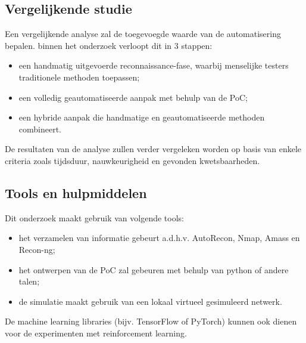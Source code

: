 



\subsection{Vergelijkende studie}

Een vergelijkende analyse zal de toegevoegde waarde van de automatisering bepalen. binnen het onderzoek verloopt dit in 3 stappen:

\begin{itemize}
    \item een handmatig uitgevoerde reconnaissance-fase, waarbij menselijke testers traditionele methoden toepassen;
    \item een volledig geautomatiseerde aanpak met behulp van de PoC;
    \item een hybride aanpak die handmatige en geautomatiseerde methoden combineert.
\end{itemize}

De resultaten van de analyse zullen verder vergeleken worden op basis van enkele criteria zoals tijdsduur, nauwkeurigheid en gevonden kwetsbaarheden.

\newpage
\subsection{Tools en hulpmiddelen}

Dit onderzoek maakt gebruik van volgende tools: 

\begin{itemize}
    \item het verzamelen van informatie gebeurt a.d.h.v. AutoRecon, Nmap, Amass en Recon-ng;
    \item het ontwerpen van de PoC zal gebeuren met behulp van python of andere talen;
    \item de simulatie maakt gebruik van een lokaal virtueel gesimuleerd netwerk.
\end{itemize}

De machine learning libraries (bijv. TensorFlow of PyTorch) kunnen ook dienen voor de experimenten met reinforcement learning.

